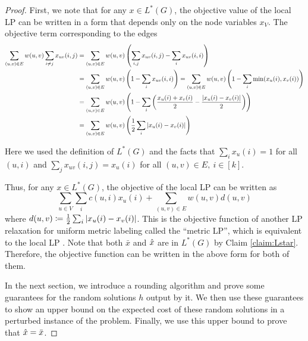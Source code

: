 \lptes*
\begin{proof}
First, we note that for any $x \in L^*(G)$, the objective value of the local LP can be written in a form that depends only on the node variables $x_V$. The objective term corresponding to the edges
\begin{align*}
    \sum_{(u,v) \in E}w(u,v)\sum_{i\ne j}x_{uv}(i,j) &= \sum_{(u,v) \in E}w(u,v)\left(\sum_{i,j}x_{uv}(i,j) - \sum_{i}x_{uv}(i,i)\right)
    \\&= \sum_{(u,v) \in E}w(u,v)\left(1 - \sum_{i}x_{uv}(i,i)\right) = \sum_{(u,v) \in E}w(u,v)\left(1 - \sum_{i}\min(x_u(i),x_v(i))\right)
    \\&= \sum_{(u,v) \in E}w(u,v)\left(1 - \sum_{i}\left(\frac{x_u(i) + x_v(i)}{2} - \frac{|x_u(i) - x_v(i)|}{2}\right)\right)
    \\&= \sum_{(u,v) \in E}w(u,v)\left(\frac{1}{2}\sum_{i}|x_u(i) - x_v(i)|\right)
\end{align*}

Here we used the definition of $L^*(G)$ and the facts that $\sum_i x_u(i) = 1$ for all $(u,i)$ and $\sum_{j}x_{uv}(i,j) = x_u(i)$ for all $(u,v)\in E,\ i\in [k]$.

Thus, for any $x \in L^*(G)$, the objective of the local LP can be written as \[\sum_{u\in V}\sum_i c(u,i)x_u(i) + \sum_{(u,v) \in E}w(u,v)d(u,v)\]
where $d(u,v) \coloneqq \frac{1}{2}\sum_{i}|x_u(i) - x_v(i)|$. This is the objective function of another LP relaxation for uniform metric labeling called the ``metric LP'', which is equivalent to the local LP \citep{archer2004approximate}. Note that both $\bar{x}$ and $\hat{x}$ are in $L^*(G)$ by Claim \ref{claim:Lstar}. Therefore, the objective function can be written in the above form for both of them.

In the next section, we introduce a rounding algorithm and prove some guarantees for the random solutions $h$ output by it. We then use these guarantees to show an upper bound on the expected cost of these random solutions in a perturbed instance of the problem. Finally, we use this upper bound to prove that $\hat{x} = \bar{x}$.


\end{proof}
